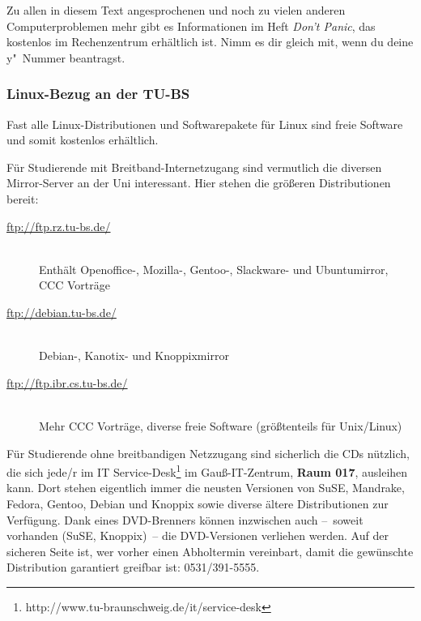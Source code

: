 \begin{multicols}{2}
		Zu allen in diesem Text angesprochenen und noch zu vielen anderen Computerproblemen mehr gibt es Informationen im Heft \emph{Don't Panic}, das kostenlos im Rechenzentrum erhältlich ist. Nimm es dir gleich mit, wenn du deine y"~Nummer beantragst.

	\subsubsection{Linux-Bezug an der TU-BS}
		Fast alle Linux-Distributionen und Softwarepakete für Linux sind freie Software und somit kostenlos erhältlich.

		Für Studierende mit Breitband-Internetzugang sind vermutlich die diversen Mirror-Server an der Uni interessant. Hier stehen die größeren Distributionen bereit:
	  
		\begin{description}
			\item[\url{ftp://ftp.rz.tu-bs.de/}]~\\Enthält Openoffice-, Mozilla-, Gentoo-, Slackware- und Ubuntumirror, CCC Vorträge
			\item[\url{ftp://debian.tu-bs.de/}]~\\Debian-, Kanotix- und Knoppixmirror
			\item[\url{ftp://ftp.ibr.cs.tu-bs.de/}]~\\Mehr CCC Vorträge, diverse freie Software (größtenteils für Unix/Linux)
		\end{description}

		Für Studierende ohne breitbandigen Netzzugang sind sicherlich die CDs nützlich, die sich jede/r im IT Service-Desk\footnote{http://www.tu-braunschweig.de/it/service-desk} im Gauß-IT-Zentrum, \textbf{Raum 017}, ausleihen kann. Dort stehen eigentlich immer die neusten Versionen von SuSE, Mandrake, Fedora, Gentoo, Debian und Knoppix sowie diverse ältere Distributionen zur Verfügung. Dank eines DVD-Brenners können inzwischen auch --~soweit vorhanden (SuSE, Knoppix)~-- die DVD-Versionen verliehen werden. Auf der sicheren Seite ist, wer vorher einen Abholtermin vereinbart, damit die gewünschte Distribution garantiert greifbar ist: 0531/391-5555.
\end{multicols}